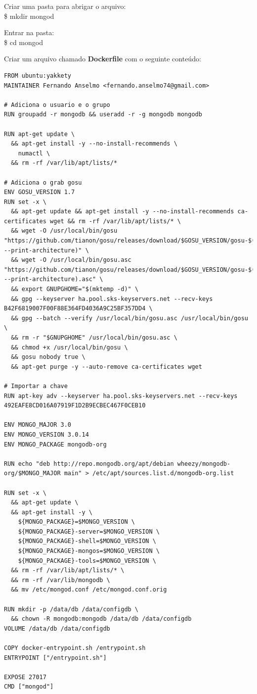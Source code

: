 \documentclass[a4paper,11pt]{article}
\begin{document}
Criar uma pasta para abrigar o arquivo: \\
{\ttfamily\$ mkdir mongod}

Entrar na pasta: \\
{\ttfamily\$ cd mongod}

Criar um arquivo chamado \textbf{Dockerfile} com o seguinte conteúdo:
\begin{lstlisting}
FROM ubuntu:yakkety
MAINTAINER Fernando Anselmo <fernando.anselmo74@gmail.com>

# Adiciona o usuario e o grupo
RUN groupadd -r mongodb && useradd -r -g mongodb mongodb

RUN apt-get update \
  && apt-get install -y --no-install-recommends \
    numactl \
  && rm -rf /var/lib/apt/lists/*

# Adiciona o grab gosu
ENV GOSU_VERSION 1.7
RUN set -x \
  && apt-get update && apt-get install -y --no-install-recommends ca-certificates wget && rm -rf /var/lib/apt/lists/* \
  && wget -O /usr/local/bin/gosu "https://github.com/tianon/gosu/releases/download/$GOSU_VERSION/gosu-$(dpkg --print-architecture)" \
  && wget -O /usr/local/bin/gosu.asc "https://github.com/tianon/gosu/releases/download/$GOSU_VERSION/gosu-$(dpkg --print-architecture).asc" \
  && export GNUPGHOME="$(mktemp -d)" \
  && gpg --keyserver ha.pool.sks-keyservers.net --recv-keys B42F6819007F00F88E364FD4036A9C25BF357DD4 \
  && gpg --batch --verify /usr/local/bin/gosu.asc /usr/local/bin/gosu \
  && rm -r "$GNUPGHOME" /usr/local/bin/gosu.asc \
  && chmod +x /usr/local/bin/gosu \
  && gosu nobody true \
  && apt-get purge -y --auto-remove ca-certificates wget

# Importar a chave
RUN apt-key adv --keyserver ha.pool.sks-keyservers.net --recv-keys 492EAFE8CD016A07919F1D2B9ECBEC467F0CEB10

ENV MONGO_MAJOR 3.0
ENV MONGO_VERSION 3.0.14
ENV MONGO_PACKAGE mongodb-org

RUN echo "deb http://repo.mongodb.org/apt/debian wheezy/mongodb-org/$MONGO_MAJOR main" > /etc/apt/sources.list.d/mongodb-org.list

RUN set -x \
  && apt-get update \
  && apt-get install -y \
    ${MONGO_PACKAGE}=$MONGO_VERSION \
    ${MONGO_PACKAGE}-server=$MONGO_VERSION \
    ${MONGO_PACKAGE}-shell=$MONGO_VERSION \
    ${MONGO_PACKAGE}-mongos=$MONGO_VERSION \
    ${MONGO_PACKAGE}-tools=$MONGO_VERSION \
  && rm -rf /var/lib/apt/lists/* \
  && rm -rf /var/lib/mongodb \
  && mv /etc/mongod.conf /etc/mongod.conf.orig

RUN mkdir -p /data/db /data/configdb \
  && chown -R mongodb:mongodb /data/db /data/configdb
VOLUME /data/db /data/configdb

COPY docker-entrypoint.sh /entrypoint.sh
ENTRYPOINT ["/entrypoint.sh"]

EXPOSE 27017
CMD ["mongod"]
\end{lstlisting}
\end{document}
